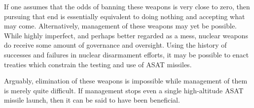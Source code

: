 If one assumes that the odds of banning these weapons is very close to zero, then pursuing that end is essentially equivalent to doing nothing and accepting what may come.  Alternatively, management of these weapons may yet be possible.  While highly imperfect, and perhaps better regarded as a mess, nuclear weapons do receive some amount of governance and oversight.  Using the history of successes and failures in nuclear disarmament efforts, it may be possible to enact treaties which constrain the testing and use of ASAT missiles.

Arguably, elimination of these weapons is impossible while management of them is merely quite difficult.  If management stops even a single high-altitude ASAT missile launch, then it can be said to have been beneficial.
